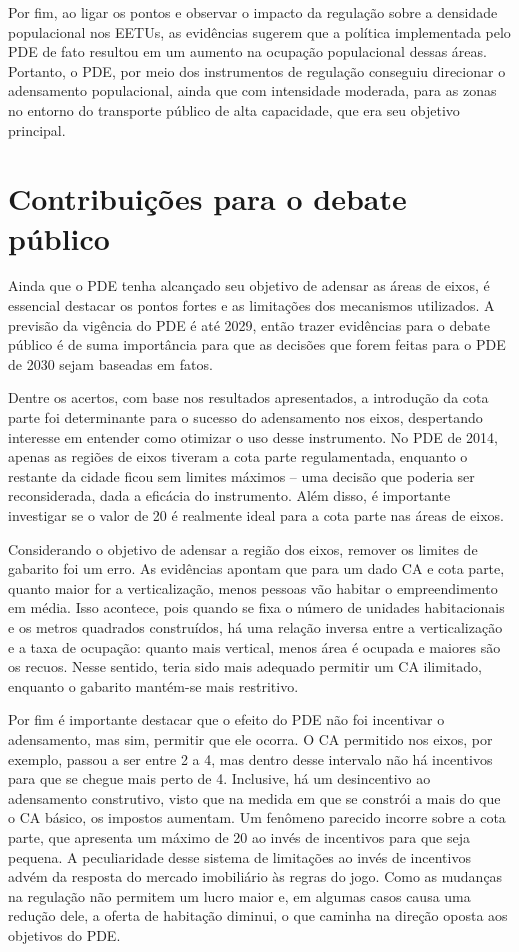 Por fim, ao ligar os pontos e observar o impacto da regulação sobre a densidade populacional nos EETUs, as evidências sugerem que a política implementada pelo PDE de fato resultou em um aumento na ocupação populacional dessas áreas. Portanto, o PDE, por meio dos instrumentos de regulação conseguiu direcionar o adensamento populacional, ainda que com intensidade moderada, para as zonas no entorno do transporte público de alta capacidade, que era seu objetivo principal.  

\section{Contribuições para o debate público}
\label{sec:contribuicoes}

Ainda que o PDE tenha alcançado seu objetivo de adensar as áreas de eixos, é essencial destacar os pontos fortes e as limitações dos mecanismos utilizados. A previsão da vigência do PDE é até 2029, então trazer evidências para o debate público é de suma importância para que as decisões que forem feitas para o PDE de 2030 sejam baseadas em fatos.

Dentre os acertos, com base nos resultados apresentados, a introdução da cota parte foi determinante para o sucesso do adensamento nos eixos, despertando interesse em entender como otimizar o uso desse instrumento. No PDE de 2014, apenas as regiões de eixos tiveram a cota parte regulamentada, enquanto o restante da cidade ficou sem limites máximos -- uma decisão que poderia ser reconsiderada, dada a eficácia do instrumento. Além disso, é importante investigar se o valor de 20 é realmente ideal para a cota parte nas áreas de eixos. 

Considerando o objetivo de adensar a região dos eixos, remover os limites de gabarito foi um erro. As evidências apontam que para um dado CA e cota parte, quanto maior for a verticalização, menos pessoas vão habitar o empreendimento em média. Isso acontece, pois quando se fixa o número de unidades habitacionais e os metros quadrados construídos, há uma relação inversa entre a verticalização e a taxa de ocupação: quanto mais vertical, menos área é ocupada e maiores são os recuos. Nesse sentido, teria sido mais adequado permitir um CA ilimitado, enquanto o gabarito mantém-se mais restritivo.

Por fim é importante destacar que o efeito do PDE não foi incentivar o adensamento, mas sim, permitir que ele ocorra. O CA permitido nos eixos, por exemplo, passou a ser entre 2 a 4, mas dentro desse intervalo não há incentivos para que se chegue mais perto de 4. Inclusive, há um desincentivo ao adensamento construtivo, visto que na medida em que se constrói a mais do que o CA básico, os impostos aumentam. Um fenômeno parecido incorre sobre a cota parte, que apresenta um máximo de 20 ao invés de incentivos para que seja pequena. A peculiaridade desse sistema de limitações ao invés de incentivos advém da resposta do mercado imobiliário às regras do jogo. Como as mudanças na regulação não permitem um lucro maior e, em algumas casos causa uma redução dele, a oferta de habitação diminui, o que caminha na direção oposta aos objetivos do PDE.
